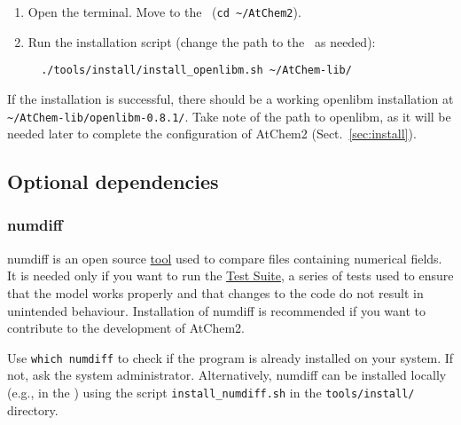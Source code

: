 \begin{enumerate}
\item Open the terminal. Move to the \maindir\ (\verb|cd ~/AtChem2|).
\item Run the installation script (change the path to the \depdir\ as
  needed):
  \begin{verbatim}
  ./tools/install/install_openlibm.sh ~/AtChem-lib/
  \end{verbatim}
\end{enumerate}

If the installation is successful, there should be a working openlibm
installation at \texttt{\textasciitilde/AtChem-lib/openlibm-0.8.1/}.
Take note of the path to openlibm, as it will be needed later to
complete the configuration of AtChem2 (Sect.~\ref{sec:install}).

\subsection{Optional dependencies} \label{subsec:optional-dependencies}

\subsubsection{numdiff}

numdiff is an open source \href{https://www.nongnu.org/numdiff/}{tool}
used to compare files containing numerical fields. It is needed only
if you want to run the \hyperref[sec:test-suite]{Test Suite}, a series
of tests used to ensure that the model works properly and that changes
to the code do not result in unintended behaviour. Installation of
numdiff is recommended if you want to contribute to the development of
AtChem2.

Use \verb|which numdiff| to check if the program is already installed
on your system. If not, ask the system administrator. Alternatively,
numdiff can be installed locally (e.g., in the \depdir) using the
script \texttt{install\_numdiff.sh} in the \texttt{tools/install/}
directory.

